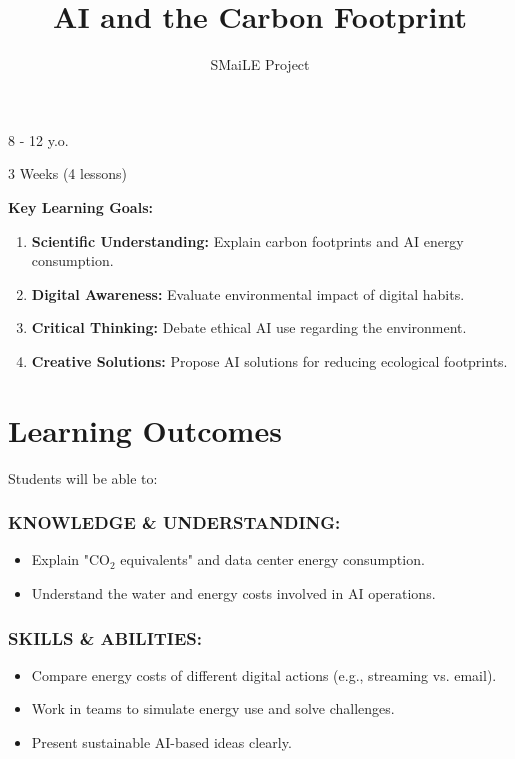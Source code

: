 \documentclass[11pt, a4paper]{article}
\begin{document}
\title{\textbf{\color{SmaileGreen}AI and the Carbon Footprint}}
\author{SMaiLE Project}
\date{}
\maketitle
\thispagestyle{plain}

\begin{keyinfobox}
    \begin{description}[leftmargin=*, labelindent=0pt]
        \item[\bfseries\color{SmaileGreen} Target Group:] 8 - 12 y.o.
        \item[\bfseries\color{SmaileGreen} Duration:] 3 Weeks (4 lessons)
    \end{description}
    \textbf{Key Learning Goals:}
    \begin{enumerate}
        \item \textbf{Scientific Understanding:} Explain carbon footprints and AI energy consumption.
        \item \textbf{Digital Awareness:} Evaluate environmental impact of digital habits.
        \item \textbf{Critical Thinking:} Debate ethical AI use regarding the environment.
        \item \textbf{Creative Solutions:} Propose AI solutions for reducing ecological footprints.
    \end{enumerate}
\end{keyinfobox}

\section*{Learning Outcomes}
Students will be able to:

\subsubsection*{KNOWLEDGE \& UNDERSTANDING:}
\begin{itemize}
    \item Explain "CO$_2$ equivalents" and data center energy consumption.
    \item Understand the water and energy costs involved in AI operations.
\end{itemize}

\subsubsection*{SKILLS \& ABILITIES:}
\begin{itemize}
    \item Compare energy costs of different digital actions (e.g., streaming vs. email).
    \item Work in teams to simulate energy use and solve challenges.
    \item Present sustainable AI-based ideas clearly.
\end{itemize}
\end{document}
